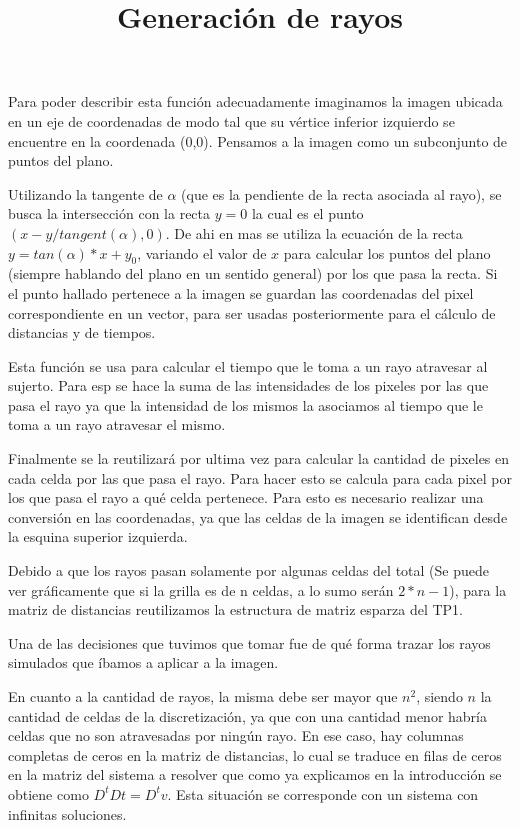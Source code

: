 \par Para poder describir esta función adecuadamente imaginamos la imagen ubicada en un eje de coordenadas de modo tal que su vértice inferior izquierdo se encuentre en la coordenada (0,0). Pensamos a la imagen como un subconjunto de puntos del plano.

\par Utilizando la tangente de $\alpha$ (que es la pendiente de la recta asociada al rayo), se busca la intersección con la recta $y=0$ la cual es el punto $(x-y/tangent(\alpha),0)$.  De ahi en mas se utiliza la ecuación de la recta $y=tan(\alpha)*x+y_{0}$, variando el valor de $x$ para calcular los puntos del plano (siempre hablando del plano en un sentido general) por los que pasa la recta. Si el punto hallado pertenece a la imagen se guardan las coordenadas del pixel correspondiente en un vector, para ser usadas posteriormente para el cálculo de distancias y de tiempos.

\par Esta función se usa para calcular el tiempo que le toma a un rayo atravesar al sujerto. Para esp se hace la suma de las intensidades de los pixeles por las que pasa el rayo ya que la intensidad de los mismos la asociamos al tiempo que le toma a un rayo atravesar el mismo.

\par Finalmente se la reutilizará por ultima vez para calcular la cantidad de pixeles en cada celda por las que pasa el rayo. Para hacer esto se calcula para cada pixel por los que pasa el rayo a qué celda pertenece. Para esto es necesario realizar una conversión en las coordenadas, ya que las celdas de la imagen se identifican desde la esquina superior izquierda.

\par Debido a que los rayos pasan solamente por algunas celdas del total (Se puede ver gráficamente que si la grilla es de n celdas, a lo sumo serán $2*n-1$), para la matriz de distancias reutilizamos la estructura de matriz esparza del TP1.

\title{Generación de rayos}

\par Una de las decisiones que tuvimos que tomar fue de qué forma trazar los rayos simulados que íbamos a aplicar a la imagen.

\par En cuanto a la cantidad de rayos, la misma debe ser mayor que $n^{2}$, siendo $n$ la cantidad de celdas de la discretización, ya que con una cantidad menor habría celdas que no son atravesadas por ningún rayo. En ese caso, hay columnas completas de ceros en la matriz de distancias, lo cual se traduce en filas de ceros en la matriz del sistema a resolver que como ya explicamos en la introducción se obtiene como $D^{t}D t = D^{t} v$. Esta situación se corresponde con un sistema con infinitas soluciones.

